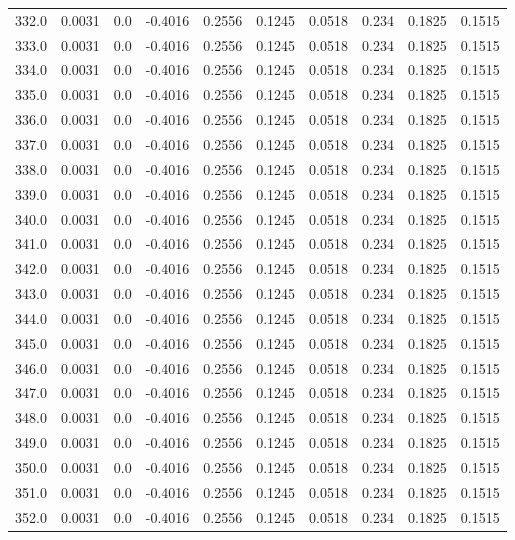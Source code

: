 \begin{longtable}{lrrrrrrrrr}
332.0 & 0.0031 & 0.0 & -0.4016 & 0.2556 & 0.1245 & 0.0518 & 0.234 & 0.1825 & 0.1515 \\
333.0 & 0.0031 & 0.0 & -0.4016 & 0.2556 & 0.1245 & 0.0518 & 0.234 & 0.1825 & 0.1515 \\
334.0 & 0.0031 & 0.0 & -0.4016 & 0.2556 & 0.1245 & 0.0518 & 0.234 & 0.1825 & 0.1515 \\
335.0 & 0.0031 & 0.0 & -0.4016 & 0.2556 & 0.1245 & 0.0518 & 0.234 & 0.1825 & 0.1515 \\
336.0 & 0.0031 & 0.0 & -0.4016 & 0.2556 & 0.1245 & 0.0518 & 0.234 & 0.1825 & 0.1515 \\
337.0 & 0.0031 & 0.0 & -0.4016 & 0.2556 & 0.1245 & 0.0518 & 0.234 & 0.1825 & 0.1515 \\
338.0 & 0.0031 & 0.0 & -0.4016 & 0.2556 & 0.1245 & 0.0518 & 0.234 & 0.1825 & 0.1515 \\
339.0 & 0.0031 & 0.0 & -0.4016 & 0.2556 & 0.1245 & 0.0518 & 0.234 & 0.1825 & 0.1515 \\
340.0 & 0.0031 & 0.0 & -0.4016 & 0.2556 & 0.1245 & 0.0518 & 0.234 & 0.1825 & 0.1515 \\
341.0 & 0.0031 & 0.0 & -0.4016 & 0.2556 & 0.1245 & 0.0518 & 0.234 & 0.1825 & 0.1515 \\
342.0 & 0.0031 & 0.0 & -0.4016 & 0.2556 & 0.1245 & 0.0518 & 0.234 & 0.1825 & 0.1515 \\
343.0 & 0.0031 & 0.0 & -0.4016 & 0.2556 & 0.1245 & 0.0518 & 0.234 & 0.1825 & 0.1515 \\
344.0 & 0.0031 & 0.0 & -0.4016 & 0.2556 & 0.1245 & 0.0518 & 0.234 & 0.1825 & 0.1515 \\
345.0 & 0.0031 & 0.0 & -0.4016 & 0.2556 & 0.1245 & 0.0518 & 0.234 & 0.1825 & 0.1515 \\
346.0 & 0.0031 & 0.0 & -0.4016 & 0.2556 & 0.1245 & 0.0518 & 0.234 & 0.1825 & 0.1515 \\
347.0 & 0.0031 & 0.0 & -0.4016 & 0.2556 & 0.1245 & 0.0518 & 0.234 & 0.1825 & 0.1515 \\
348.0 & 0.0031 & 0.0 & -0.4016 & 0.2556 & 0.1245 & 0.0518 & 0.234 & 0.1825 & 0.1515 \\
349.0 & 0.0031 & 0.0 & -0.4016 & 0.2556 & 0.1245 & 0.0518 & 0.234 & 0.1825 & 0.1515 \\
350.0 & 0.0031 & 0.0 & -0.4016 & 0.2556 & 0.1245 & 0.0518 & 0.234 & 0.1825 & 0.1515 \\
351.0 & 0.0031 & 0.0 & -0.4016 & 0.2556 & 0.1245 & 0.0518 & 0.234 & 0.1825 & 0.1515 \\
352.0 & 0.0031 & 0.0 & -0.4016 & 0.2556 & 0.1245 & 0.0518 & 0.234 & 0.1825 & 0.1515 \\

\end{longtable}
